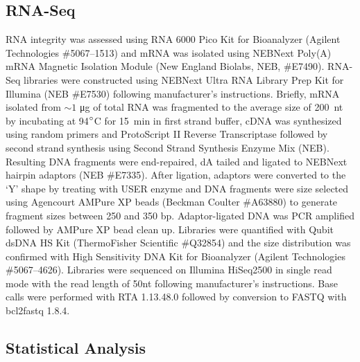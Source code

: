 \subsection*{RNA-Seq}
\label{sb:rna_seq}
RNA integrity was assessed using RNA 6000 Pico Kit for Bioanalyzer (Agilent
Technologies \#5067--1513) and mRNA was isolated using NEBNext Poly(A) mRNA
Magnetic Isolation Module (New England Biolabs, NEB, \#E7490). RNA-Seq libraries
were constructed using NEBNext Ultra RNA Library Prep Kit for Illumina (NEB
\#E7530) following manufacturer’s instructions. Briefly, mRNA isolated from
$\sim1$ \si{\micro\gram} of total RNA was fragmented to the average size of
200~nt by incubating at 94$\degree$C for 15~min in first strand buffer, cDNA was
synthesized using random primers and ProtoScript II Reverse Transcriptase
followed by second strand synthesis using Second Strand Synthesis Enzyme Mix
(NEB). Resulting DNA fragments were end-repaired, dA tailed and ligated to
NEBNext hairpin adaptors (NEB \#E7335). After ligation, adaptors were converted
to the ‘Y’ shape by treating with USER enzyme and DNA fragments were size
selected using Agencourt AMPure XP beads (Beckman Coulter \#A63880) to generate
fragment sizes between 250 and 350 bp. Adaptor-ligated DNA was PCR amplified
followed by AMPure XP bead clean up. Libraries were quantified with Qubit dsDNA
HS Kit (ThermoFisher Scientific \#Q32854) and the size distribution was
confirmed with High Sensitivity DNA Kit for Bioanalyzer (Agilent Technologies
\#5067--4626). Libraries were sequenced on Illumina HiSeq2500 in single read
mode with the read length of 50nt following manufacturer's instructions. Base
calls were performed with RTA 1.13.48.0 followed by conversion to FASTQ with
bcl2fastq 1.8.4.

\subsection*{Statistical Analysis}
\label{sb:statistics}

